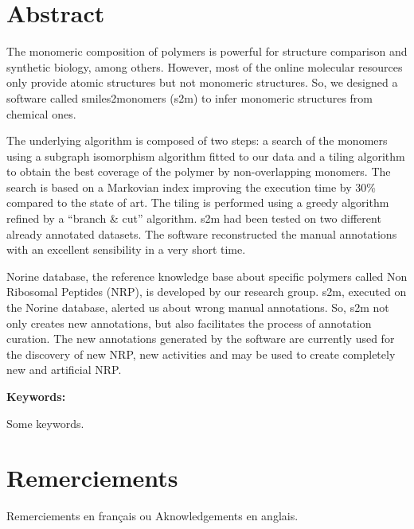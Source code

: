 \documentclass[12pt]{LHSV_thesis}
\begin{document}
\section*{\Huge Abstract}
%
\vspace{2cm}

The monomeric composition of polymers is powerful for structure comparison and synthetic biology, among others.
However, most of the online molecular resources only provide atomic structures but not monomeric structures.
So, we designed a software called smiles2monomers (s2m) to infer monomeric structures from chemical ones.

The underlying algorithm is composed of two steps: a search of the monomers using a subgraph isomorphism algorithm fitted to our data and a tiling algorithm to obtain the best coverage of the polymer by non-overlapping monomers.
The search is based on a Markovian index improving the execution time by 30\% compared to the state of art.
The tiling is performed using a greedy algorithm refined by a ``branch \& cut'' algorithm.
s2m had been tested on two different already annotated datasets.
The software reconstructed the manual annotations with an excellent sensibility in a very short time.

Norine database, the reference knowledge base about specific polymers called Non Ribosomal Peptides (NRP), is developed by our research group.
s2m, executed on the Norine database, alerted us about wrong manual annotations.
So, s2m not only creates new annotations, but also facilitates the process of annotation curation.
The new annotations generated by the software are currently used for the discovery of new NRP, new activities and may be used to create completely new and artificial NRP.

\vspace*{28pt}\par
\textbf{Keywords:}\par
Some keywords.
\par
\cleardoublepage

\section*{\Huge Remerciements}
%
\vspace{2cm}

Remerciements en français ou  Aknowledgements en anglais.
\end{document}
